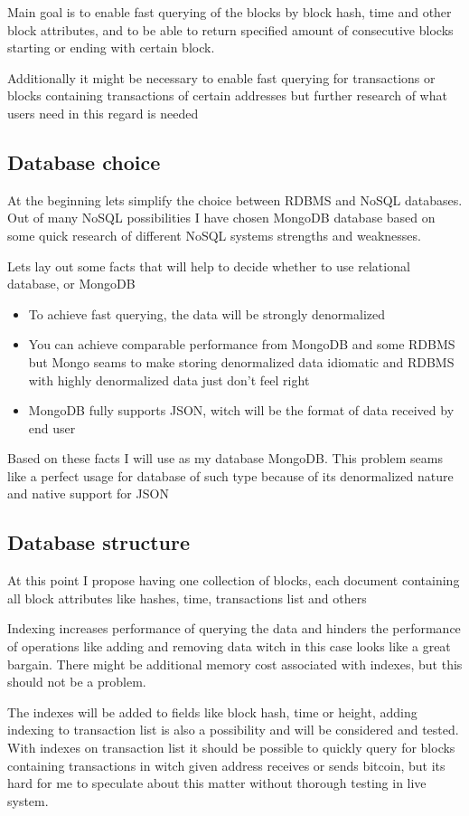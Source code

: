 \documentclass{article}
\begin{document}
Main goal is to enable fast querying of the blocks by block hash, time and other block attributes, and to be able to return specified amount of consecutive blocks starting or ending with certain block. 

Additionally it might be necessary to enable fast querying for transactions or blocks containing transactions of certain addresses but further research of what users need in this regard is needed

\subsection{Database choice}
At the beginning lets simplify the choice between RDBMS and NoSQL databases. Out of many NoSQL possibilities I have chosen MongoDB database based on some quick research of different NoSQL systems strengths and weaknesses.

Lets lay out some facts that will help to decide whether to use relational database, or MongoDB

\begin{itemize}
\item 
To achieve fast querying, the data will be strongly denormalized
\item 
You can achieve comparable performance from MongoDB and some RDBMS but Mongo seams to make storing denormalized data idiomatic and RDBMS with highly denormalized data just don't feel right
\item MongoDB fully supports JSON, witch will be the format of data received by end user
\end{itemize}

Based on these facts I will use as my database MongoDB. This problem seams like a perfect usage for database of such type because of its denormalized nature and native support for JSON
 \subsection{Database structure}
 
 At this point I propose having one collection of blocks, each document containing all block attributes like hashes, time, transactions list and others
 
Indexing increases performance of querying the data and hinders the performance of operations like adding and removing data witch in this case looks like a great bargain. There might be additional memory cost associated with indexes, but this should not be a problem.

The indexes will be added to fields like block hash, time or height, adding indexing to transaction list is also a possibility and will be considered and tested. With indexes on transaction list it should be possible to quickly query for blocks containing transactions in witch given address receives or sends bitcoin, but its hard for me to speculate about this matter without thorough testing in live system.
\end{document}
